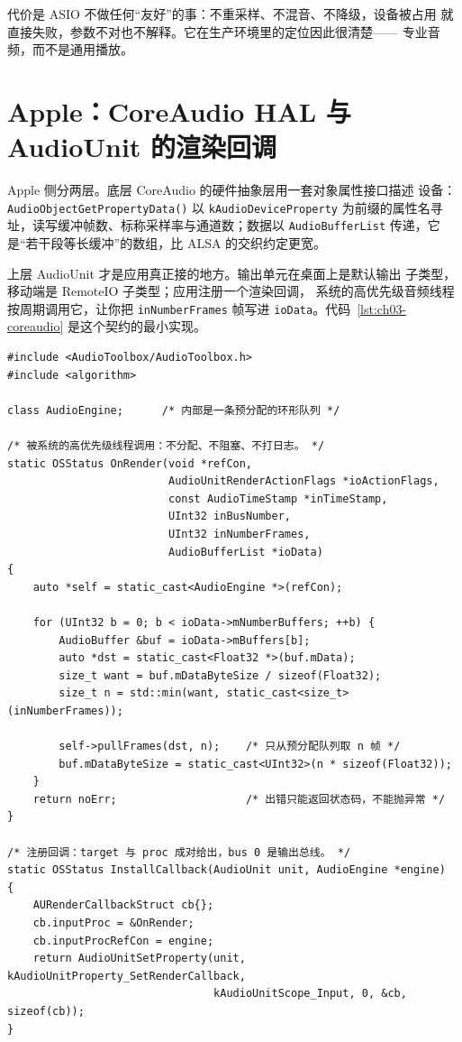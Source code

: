 \documentclass[12pt,a4paper,fontset=fandol]{ctexbook}
\newcommand{\Fn}[1]{\texttt{#1()}}
\newcommand{\Tp}[1]{\texttt{#1}}
\begin{document}
代价是 ASIO 不做任何``友好''的事：不重采样、不混音、不降级，设备被占用
就直接失败，参数不对也不解释。它在生产环境里的定位因此很清楚——
专业音频，而不是通用播放。

\section{Apple：CoreAudio HAL 与 AudioUnit 的渲染回调}
\label{sec:ch03-coreaudio}

Apple 侧分两层。底层 CoreAudio 的硬件抽象层用一套对象属性接口描述
设备：\Fn{AudioObjectGetPropertyData} 以 \Tp{kAudioDeviceProperty}
为前缀的属性名寻址，读写缓冲帧数、标称采样率与通道数；数据以
\Tp{AudioBufferList} 传递，它是``若干段等长缓冲''的数组，比 ALSA
的交织约定更宽。

上层 AudioUnit 才是应用真正接的地方。输出单元在桌面上是默认输出
子类型，移动端是 RemoteIO 子类型；应用注册一个渲染回调，
系统的高优先级音频线程按周期调用它，让你把 \Tp{inNumberFrames}
帧写进 \Tp{ioData}。代码~\ref{lst:ch03-coreaudio} 是这个契约的最小实现。

\begin{lstlisting}[style=cppstyle,
  caption={AudioUnit 渲染回调：按系统给的缓冲列表就地填浮点帧},
  label={lst:ch03-coreaudio}]
#include <AudioToolbox/AudioToolbox.h>
#include <algorithm>

class AudioEngine;      /* 内部是一条预分配的环形队列 */

/* 被系统的高优先级线程调用：不分配、不阻塞、不打日志。 */
static OSStatus OnRender(void *refCon,
                         AudioUnitRenderActionFlags *ioActionFlags,
                         const AudioTimeStamp *inTimeStamp,
                         UInt32 inBusNumber,
                         UInt32 inNumberFrames,
                         AudioBufferList *ioData)
{
    auto *self = static_cast<AudioEngine *>(refCon);

    for (UInt32 b = 0; b < ioData->mNumberBuffers; ++b) {
        AudioBuffer &buf = ioData->mBuffers[b];
        auto *dst = static_cast<Float32 *>(buf.mData);
        size_t want = buf.mDataByteSize / sizeof(Float32);
        size_t n = std::min(want, static_cast<size_t>(inNumberFrames));

        self->pullFrames(dst, n);    /* 只从预分配队列取 n 帧 */
        buf.mDataByteSize = static_cast<UInt32>(n * sizeof(Float32));
    }
    return noErr;                    /* 出错只能返回状态码，不能抛异常 */
}

/* 注册回调：target 与 proc 成对给出，bus 0 是输出总线。 */
static OSStatus InstallCallback(AudioUnit unit, AudioEngine *engine)
{
    AURenderCallbackStruct cb{};
    cb.inputProc = &OnRender;
    cb.inputProcRefCon = engine;
    return AudioUnitSetProperty(unit, kAudioUnitProperty_SetRenderCallback,
                                kAudioUnitScope_Input, 0, &cb, sizeof(cb));
}
\end{lstlisting}
\end{document}
